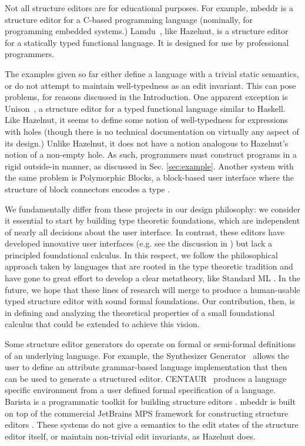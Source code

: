 \documentclass[9pt]{sigplanconf}
\begin{document}
Not all structure editors are for educational purposes. For example,
mbeddr \cite{voelter_mbeddr:_2012} is a structure editor for a C-based
programming language (nominally, for programming embedded systems.)
Lamdu~\cite{lamdu}, like Hazelnut, is a structure editor for a statically
typed functional language. It is designed for use by professional
programmers.

The examples given so far either define a language with a trivial static
semantics, or do not attempt to maintain well-typedness as an edit
invariant. This can pose problems, for reasons discussed in the
Introduction. One apparent exception is Unison~\cite{unison}, a structure
editor for a typed functional language similar to Haskell. Like Hazelnut,
it seems to define some notion of well-typedness for expressions with holes
(though there is no technical documentation on virtually any aspect of its
design.) Unlike Hazelnut, it does not have a notion analogous to Hazelnut's
notion of a non-empty hole. As such, programmers must construct programs in
a rigid outside-in manner, as discussed in Sec. \ref{sec:example}. Another
system with the same problem is Polymorphic Blocks, a block-based user
interface where the structure of block connectors encodes a
type \cite{DBLP:conf/chi/LernerFG15}.

We fundamentally differ from these projects in our design philosophy: we
consider it essential to start by building type theoretic foundations,
which are independent of nearly all decisions about the user interface. In
contrast, these editors have developed innovative user interfaces (e.g. see
the discussion in \cite{DBLP:conf/sle/VolterSBK14}) but lack a principled
foundational calculus. In this respect, we follow the philosophical
approach taken by languages that are rooted in the type theoretic tradition
and have gone to great effort to develop a clear metatheory, like Standard
ML \cite{mthm97-for-dart,Harper00atype-theoretic}.  In the future, we hope
that these lines of research will merge to produce a human-usable typed
structure editor with sound formal foundations. Our contribution, then, is
in defining and analyzing the theoretical properties of a small
foundational calculus that could be extended to achieve this vision.

Some structure editor generators do operate on formal or semi-formal
definitions of an underlying language. For example, the Synthesizer
Generator~\cite{Reps:1984:SG:390010.808247} allows the user to define an
attribute grammar-based language implementation that then can be used to
generate a structured editor. CENTAUR~\cite{Borras:1988:CS:64140.65005}
produces a language specific environment from a user defined formal
specification of a language. Barista is a programmatic toolkit for building
structure editors \cite{ko_barista:_2006}. mbeddr is built on top of the
commercial JetBrains MPS framework for constructing structure
editors \cite{voelter2011language,DBLP:journals/software/VoelterWK15}. These
systems do not give a semantics to the edit states of the structure editor
itself, or maintain non-trivial edit invariants, as Hazelnut does.
\end{document}

